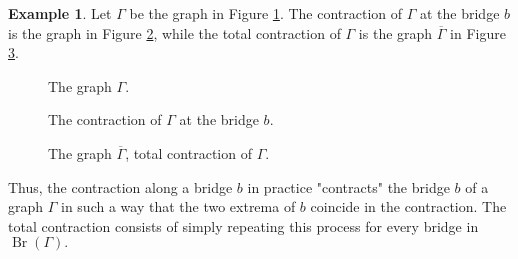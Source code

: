 \documentclass[a4paper,12 pt,titlepage,twoside]{book}
\DeclareMathOperator{\br}{Br}
\theoremstyle{plain}
\theoremstyle{theorem}
\theoremstyle{definition}
\newtheorem{exm}[thm]{Example}
\theoremstyle{remark}
\begin{document}
	\begin{exm}
		Let $\Gamma$ be the graph in Figure \ref{fig: graph gamma}. The contraction of $\Gamma$ at the bridge $b$ is the graph in Figure \ref{fig: contraction at b}, while the total contraction of $\Gamma$ is the graph $\overline{\Gamma}$ in Figure \ref{fig: total contraction}.
		\begin{figure}[h!]
			\centering
			\caption{The graph $\Gamma$.}
			\label{fig: graph gamma}
		\end{figure}
		\begin{figure}[h!]
			\caption{The contraction of $\Gamma$ at the bridge $b$.}
			\label{fig: contraction at b}
			\centering
		\end{figure}
		\begin{figure}[h!]
			\caption{The graph $\overline{\Gamma}$, total contraction of $\Gamma$.}
			\label{fig: total contraction}
			\centering
		\end{figure}
	\end{exm}
	Thus, the contraction along a bridge $b$ in practice "contracts" the bridge $b$ of a graph $\Gamma$ in such a way that the two extrema of $b$ coincide in the contraction. The total contraction consists of simply repeating this process for every bridge in $\br(\Gamma).$
	
\end{document}
